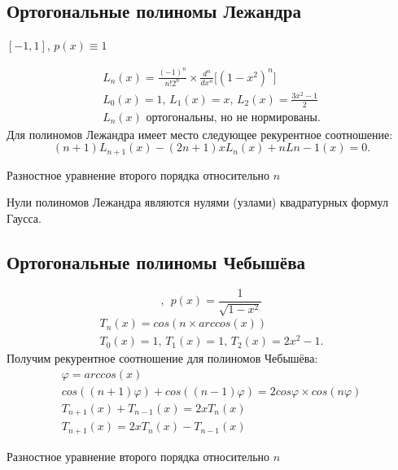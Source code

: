 \documentclass[a4paper,11pt]{article}
\begin{document}
\subsection{Ортогональные полиномы Лежандра}
\begin{center}
  $[-1, 1]$, \hspace{5pt} $p(x) \equiv 1$
\end{center}
\begin{gather*}
  \boxed{L_n(x) = \frac{(-1)^n}{n!2^n} \times \frac{d^n}{dx^n}\bigg[(1-x^2)^n\bigg]} \\
  L_0(x)=1,\, L_1(x)=x,\, L_2(x)=\frac{3x^2-1}{2} \\
  \text{$L_n(x)$ ортогональны, но не нормированы}.
\end{gather*}
Для полиномов Лежандра имеет место следующее рекурентное соотношение:
\begin{equation*}
  (n+1)L_{n+1}(x)-(2n+1)xL_n(x)+nL{n-1}(x)=0.
\end{equation*}
\begin{center}
  \small{Разностное уравнение второго порядка относительно $n$}
\end{center}
Нули полиномов Лежандра являются нулями (узлами) квадратурных формул Гаусса.

\subsection{Ортогональные полиномы Чебышёва}
\begin{equation*}
  [-1, 1], \hspace{5pt} p(x) = \frac{1}{\sqrt{1-x^2}}
\end{equation*}
\begin{gather*}
  \boxed{T_n(x) = cos(n \times arccos(x))} \\
  T_0(x) = 1,\, T_1(x) = 1,\, T_2(x) = 2x^2-1.
\end{gather*}
Получим рекурентное соотношение для полиномов Чебышёва:
\begin{gather*}
  \varphi = arccos(x) \\
  cos((n+1)\varphi) + cos((n-1)\varphi) = 2cos\varphi \times cos(n\varphi) \\
  T_{n+1}(x) + T_{n-1}(x) = 2xT_n(x) \\
  T_{n+1}(x) = 2xT_n(x) - T_{n-1}(x)
\end{gather*}
\begin{center}
  \small{Разностное уравнение второго порядка относительно $n$}
\end{center}
\end{document}

